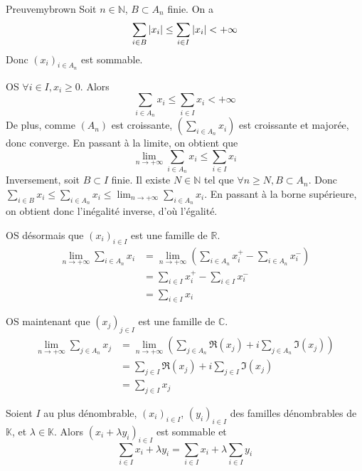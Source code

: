     \begin{demo}{Preuve}{mybrown}
        Soit $n \in \mathbb{N}$, $B \subset A_n$ finie. On a 
        \[ \sum_{i \in B} \left\lvert x_i\right\rvert \leq \sum_{i \in I} \left\lvert x_i\right\rvert < +\infty \]   
        Donc $(x_i)_{i \in A_n}$ est sommable.

        OS $\forall i \in I, x_i \geq 0$. Alors 
        \[ \sum_{i \in A_n} x_i \leq \sum_{i \in I} x_i < +\infty \]   
        De plus, comme $(A_n)$ est croissante, $\left(\sum_{i \in A_n} x_i\right)$ est croissante et majorée, donc converge. En passant à la limite, on obtient que 
        \[ \lim_{n \to +\infty} \sum_{i \in A_n} x_i \leq \sum_{i \in I} x_i \]   
        Inversement, soit $B \subset I$ finie. Il existe $N \in \mathbb{N}$ tel que $\forall n \geq N, B \subset A_n$. Donc $\sum_{i \in B} x_i \leq \sum_{i \in A_n} x_i \leq \lim_{n \to +\infty} \sum_{i \in A_n} x_i$. En passant à la borne supérieure, on obtient donc l’inégalité inverse, d’où l’égalité.

        OS désormais que $(x_i)_{i \in I}$ est une famille de $\mathbb{R}$. 
        \begin{align*}
            \lim_{n \to +\infty} \sum_{i \in A_n} x_i 
            &= \lim_{n \to +\infty} \left(\sum_{i \in A_n} x_i^+ - \sum_{i \in A_n} x_i^-\right) \\
            &= \sum_{i \in I} x_i^+ - \sum_{i \in I} x_i^- \\
            &= \sum_{i \in I} x_i
        \end{align*}

        OS maintenant que $(x_j)_{j \in I}$ est une famille de $\mathbb{C}$. 
        \begin{align*}
            \lim_{n \to +\infty} \sum_{j \in A_n} x_j 
            &= \lim_{n \to +\infty} \left(\sum_{j \in A_n} \Re(x_j) + i \sum_{j \in A_n} \Im(x_j) \right) \\
            &= \sum_{j \in I} \Re(x_j) + i \sum_{j \in I} \Im(x_j) \\
            &= \sum_{j \in I} x_j
        \end{align*}
    \end{demo}

    \begin{prop}{}{}
        Soient $I$ au plus dénombrable, $(x_i)_{i \in I}$, $(y_i)_{i \in I}$ des familles dénombrables de $\mathbb{K}$, et $\lambda \in \mathbb{K}$. Alors $(x_i + \lambda y_i)_{i \in I}$ est sommable et 
        \[ \sum_{i \in I} x_i + \lambda y_i = \sum_{i \in I} x_i + \lambda \sum_{i \in I} y_i \]   
    \end{prop}

